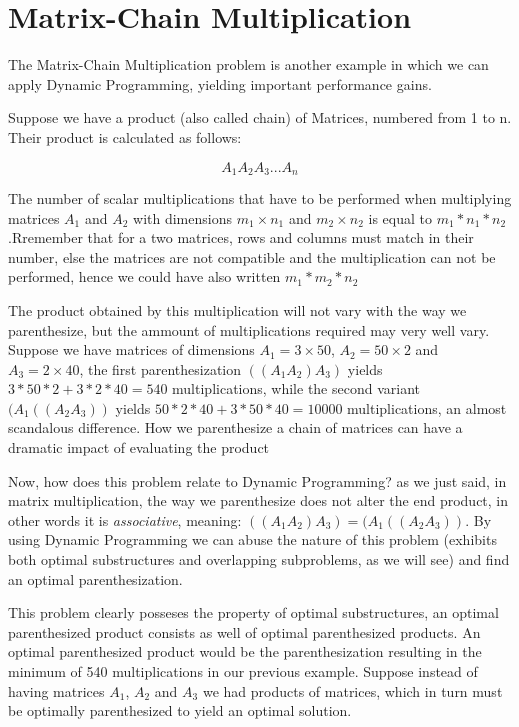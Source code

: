 \section{Matrix-Chain Multiplication}

The Matrix-Chain Multiplication problem is another example in which we can 
apply Dynamic Programming, yielding important performance gains.

Suppose we have a product (also called chain) of Matrices, numbered from 1 to n. Their product is
calculated as follows:

$$A_1A_2A_3...A_n$$

The number of scalar multiplications that have to be performed when multiplying matrices $A_1$
and $A_2$ with dimensions $m_1 \times n_1$ and $m_2\times n_2$ is equal to $m_1*n_1*n_2$ .Rremember that
for a two matrices, rows and columns must match in their number, else the matrices are not 
compatible and the multiplication can not be performed, hence we could have also written $m_1*m_2*n_2$

The product obtained by this multiplication will not vary with the way we parenthesize,
but the ammount of multiplications required may very well vary. Suppose we have
matrices of dimensions $A_1 = 3 \times 50$, $A_2 = 50 \times 2$ and $A_3 = 2 \times 40$, 
the first parenthesization $((A_1A_2)A_3)$ yields $3*50*2 + 3*2*40 = 540$
multiplications, while the second variant $(A_1((A_2A_3))$ yields 
$50*2*40 + 3*50*40 = 10000$ multiplications, an almost scandalous difference.
How we parenthesize a chain of matrices can have a dramatic impact of evaluating
the product \cite{cormen2009introduction}

Now, how does this problem relate to Dynamic Programming? as we just said, in matrix 
multiplication, the way we parenthesize does not alter the end product, in other words it is
\emph{associative}, meaning:  $((A_1A_2)A_3) = (A_1((A_2A_3))$. By using Dynamic Programming
we can abuse the nature of this problem (exhibits both optimal substructures and
overlapping subproblems, as we will see) and find an optimal parenthesization.

This problem clearly posseses the property of optimal substructures, an optimal 
parenthesized product consists as well of optimal parenthesized products. An optimal
parenthesized product would be the parenthesization resulting in the minimum of 540
multiplications in our previous example. Suppose instead of having matrices $A_1$, 
$A_2$ and $A_3$ we had products of matrices, which in turn must be optimally parenthesized
to yield an optimal solution.

